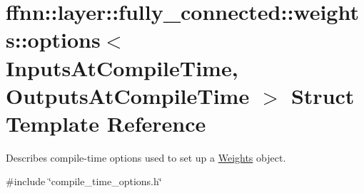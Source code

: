 \hypertarget{structffnn_1_1layer_1_1fully__connected_1_1weights_1_1options}{\section{ffnn\-:\-:layer\-:\-:fully\-\_\-connected\-:\-:weights\-:\-:options$<$ Inputs\-At\-Compile\-Time, Outputs\-At\-Compile\-Time $>$ Struct Template Reference}
\label{structffnn_1_1layer_1_1fully__connected_1_1weights_1_1options}
}


Describes compile-\/time options used to set up a \hyperlink{classffnn_1_1layer_1_1fully__connected_1_1_weights}{Weights} object.  




{\ttfamily \#include \char`\"{}compile\-\_\-time\-\_\-options.\-h\char`\"{}}

